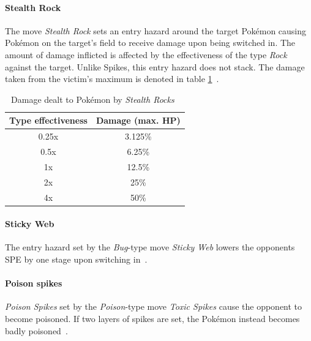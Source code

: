 \paragraph{Stealth Rock}
\label{sec:stealthrock}
The move \textit{Stealth Rock} sets an entry hazard around the target Pokémon
causing Pokémon on the target's field to receive damage upon being switched in.
The amount of damage inflicted is affected by the effectiveness of the type
\textit{Rock} against the target. Unlike Spikes, this entry hazard does not stack.
The damage taken from the victim's maximum is denoted in table 
\ref{tab:stealth-rock-damage}~\autocite{Bulbapedia:StealthRock}.
\begin{table}[h]
	\centering
	\begin{tabular}{|c|c|}
		\hline
		\textbf{Type effectiveness} & \textbf{Damage (max. \ac{HP}}) \\
		\hline 
		0.25x & 3.125\% \\ 
		\hline 
		0.5x &  6.25\% \\ 
		\hline 
		1x & 12.5\% \\
		\hline
		2x & 25\% \\
		\hline
		4x & 50\% \\
		\hline
	\end{tabular} 
	\caption{Damage dealt to Pokémon by \textit{Stealth Rocks}~\autocite{Bulbapedia:StealthRock}}
	\label{tab:stealth-rock-damage}
\end{table}

\paragraph{Sticky Web}
The entry hazard set by the \textit{Bug}-type move \textit{Sticky Web} lowers the
opponents \ac{SPE} by one stage upon switching in~\autocite{Bulbapedia:StickyWeb}. 

\paragraph{Poison spikes}
\label{sec:poison-spikes}
\textit{Poison Spikes} set by the \textit{Poison}-type move \textit{Toxic Spikes}
cause the opponent to become poisoned. If two layers of spikes are set, the
Pokémon instead becomes badly poisoned~\autocite{Bulbapedia:ToxicSpikes}.

